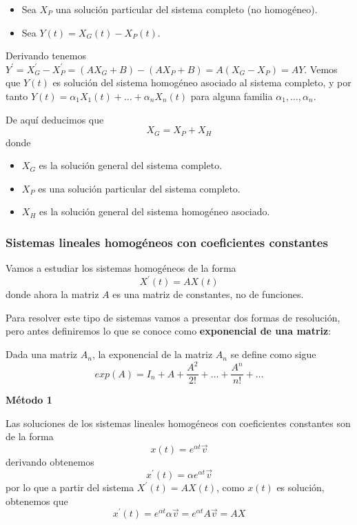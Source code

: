 \documentclass{mathnotes}
\begin{document}
\begin{itemize}
\item Sea $X_P$ una solución particular del sistema completo (no homogéneo). 

\item Sea $Y(t) = X_G(t)-X_P(t)$.
\end{itemize}
\noindent Derivando tenemos $Y^\prime = X_G^\prime -X_P^\prime = (AX_G+B)-(AX_P+B) = A(X_G-X_P) = AY$.
Vemos que $Y(t)$ es solución del sistema homogéneo asociado al sistema completo, y por tanto $Y(t) = \alpha_1X_1(t)+\hdots+\alpha_nX_n(t)$ para alguna familia $\alpha_1,\hdots,\alpha_n$.

De aquí deducimos que $$X_G = X_P+X_H$$
donde 
\begin{itemize}
\item $X_G$ es la solución general del sistema completo.

\item $X_P$ es una solución particular del sistema completo.

\item $X_H$ es la solución general del sistema homogéneo asociado.
\end{itemize}

\subsubsection{Sistemas lineales homogéneos con coeficientes constantes}
Vamos a estudiar los sistemas homogéneos de la forma $$X^\prime(t) = AX(t)$$
donde ahora la matriz $A$ es una matriz de constantes, no de funciones.

Para resolver este tipo de sistemas vamos a presentar dos formas de resolución, pero antes definiremos lo que se conoce como \textbf{exponencial de una matriz}:

\begin{definition}

Dada una matriz $A_n$, la exponencial de la matriz $A_n$ se define como sigue
$$exp(A) = I_n + A + \frac{A^2}{2!} + \hdots + \frac{A^n}{n!} + \hdots$$

\end{definition}

\vspace{5mm}
\noindent\textbf{Método 1}

Las soluciones de los sistemas lineales homogéneos con coeficientes constantes son de la forma $$x(t) = e^{\alpha t}\vec{v}$$
derivando obtenemos $$x^\prime(t) = \alpha e^{\alpha t}\vec{v}$$ por lo que a partir del sistema $X^\prime(t) = AX(t)$, como $x(t)$ es solución, obtenemos que $$x^\prime(t) = e^{\alpha t}\alpha\vec{v} = e^{\alpha t}A\vec{v} = AX$$
\end{document}
